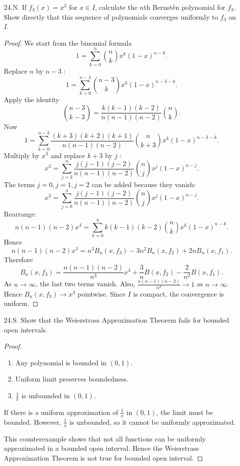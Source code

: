 \begin{itemize}
(f) $\frac{x}{n} e^{-x / n}$.
\begin{proof}
	This function converges pointwise to the zero function. However the convergence is not uniform. To see this, observe that for any $n$, 
	\[
		\operatorname{sup}_x |f_n(x) - f(x)| \ge |f_n(n) - f(n)| = |e^{-1} - 0| = e^{-1}
	.\] 
	which does not vanish.
\end{proof}
\item [24.N.] If $f_3(x)=x^3$ for $x \in I$, calculate the $n$th Bernstěn polynomial for $f_3$. Show directly that this sequence of polynomials converges uniformly to $f_3$ on $I$.
\begin{proof}
	We start from the binomial formula
	\[
		1 = \sum_{k=0}^{n} \binom{n}{k} x^k (1-x)^{n-k}
	.\] 
	Replace $n$ by $n-3$ :
\[
		1 = \sum_{k=0}^{n-3} \binom{n-3}{k} x^k (1-x)^{n-3-k}
	.\]
	Apply the identity \[
		\binom{n-3}{k-3} = \frac{k(k-1)(k-2)}{n(n-1)(n-2)}\binom{n}{k}
	.\] 
	Now
\[
		1 = \sum_{k=0}^{n-3} \frac{(k+3)(k+2)(k+1)}{n(n-1)(n-2)}\binom{n}{k+3} x^k (1-x)^{n-3-k}
	.\]
	Multiply by $x^3$ and replace $k+3$ by $j$ :
\[
		x^3 = \sum_{j=3}^{n} \frac{j(j-1)(j-2)}{n(n-1)(n-2)}\binom{n}{j} x^j (1-x)^{n-j}
	.\]
	The terms $j=0, j=1, j=2$ can be added because they vanish:
\[
		x^3 = \sum_{j=0}^{n} \frac{j(j-1)(j-2)}{n(n-1)(n-2)}\binom{n}{j} x^j (1-x)^{n-j}
	.\]
	Rearrange:
\[
		n(n-1)(n-2)x^3 = \sum_{k=0}^{n} k(k-1)(k-2)\binom{n}{k} x^k (1-x)^{n-k}
	.\]
	Hence
	\[
		n(n-1)(n-2)x^3 = n^3 B_n(x, f_3) -3 n^2 B_n(x, f_2) + 2 nB_n(x, f_1)
	.\]
	Therefore
	\[
		B_n(x, f_3) = \frac{n(n-1)(n-2)}{n^3} x^3 + \frac{3}{n}B(x, f_2) - \frac{2}{n^2}B(x, f_1)
	.\] 
	As $n\to \infty $, the last two terms vanish. Also, $\frac{n(n-1)(n-2)}{n^3} \to 1$ as $n\to \infty $. Hence $B_n(x, f_3) \to x^3$ pointwise. Since $I$ is compact, the convergence is uniform.
\end{proof}


\item [24.S.] Show that the Weierstrass Approximation Theorem fails for bounded open intervals.
\begin{proof}
	\begin{enumerate}
		\item Any polynomial is bounded in $(0,1)$.
		\item Uniform limit preserves boundedness.
		\item  $\frac{1}{x}$ is unbounded in $(0,1)$.
	\end{enumerate}
	If there is a uniform approximation of $\frac{1}{x}$ in $(0,1)$, the limit must be bounded. However, $\frac{1}{x}$ is unbounded, so it cannot be uniformly approximated. 

	This counterexample shows that not all functions can be uniformly approximated in a bounded open interval. Hence the Weierstrass Approximation Theorem is not true for bounded open interval.
\end{proof}

\end{itemize}

